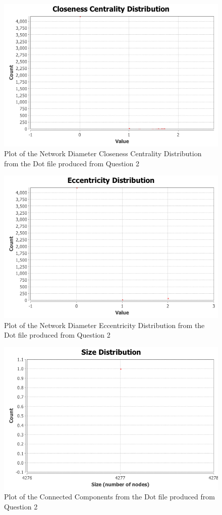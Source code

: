 \documentclass[letterpaper,11pt]{article}
\begin{document}
\begin{figure}[p]
\includegraphics[scale=0.5]{"q3/Network-Diameter/Closeness Centrality Distribution"}
\caption{Plot of the Network Diameter Closeness Centrality Distribution from the Dot file produced from Question 2}
\label{fig:q3netdiam-closeness}
\end{figure}

\begin{figure}[p]
\includegraphics[scale=0.5]{"q3/Network-Diameter/Eccentricity Distribution"}
\caption{Plot of the Network Diameter Eccentricity Distribution from the Dot file produced from Question 2}
\label{fig:q3netdiam-eccentricity}
\end{figure}

\begin{figure}[p]
\includegraphics[scale=0.5]{q3/Connected-Components/cc-size-distribution.png}
\caption{Plot of the Connected Components from the Dot file produced from Question 2}
\label{fig:q3cc}
\end{figure}

\clearpage


\end{document}
